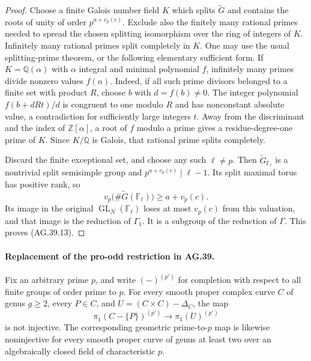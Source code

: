 \begin{proof}
Choose a finite Galois number field \(K\) which splits
\(\widetilde G\) and contains the roots of unity of order
\(p^{a+v_p(c)}\). Exclude also the finitely many rational
primes needed to spread the chosen splitting isomorphism
over the ring of integers of \(K\). Infinitely many rational primes split
completely in \(K\). One may use the usual splitting-prime
theorem, or the following elementary sufficient form. If
\(K=\mathbb Q(\alpha)\) with \(\alpha\) integral and minimal
polynomial \(f\), infinitely many primes divide nonzero values
\(f(n)\). Indeed, if all such prime divisors belonged to a
finite set with product \(R\), choose \(b\) with
\(d=f(b)\ne0\). The integer polynomial
\(f(b+dRt)/d\) is congruent to one modulo \(R\) and has
nonconstant absolute value, a contradiction for sufficiently
large integers \(t\). Away from the discriminant and the
index of \(\mathbb Z[\alpha]\), a root of \(f\) modulo a
prime gives a residue-degree-one prime of \(K\). Since
\(K/\mathbb Q\) is Galois, that rational prime splits completely.

Discard the finite exceptional set, and choose any such
\(\ell\ne p\). Then \(\widetilde G_{\mathbb F_\ell}\)
is a nontrivial split semisimple group and
\(p^{a+v_p(c)}\mid\ell-1\). Its split maximal torus has
positive rank, so
\[
       v_p\bigl(\#\widetilde G(\mathbb F_\ell)\bigr)
                          \geq a+v_p(c).
\]
Its image in the original \(\operatorname{GL}_N(\mathbb F_\ell)\)
loses at most \(v_p(c)\) from this valuation, and that image is
the reduction of \(\Gamma_1\). It is a subgroup of the
reduction of \(\Gamma\). This proves (AG.39.13).
\end{proof}

\paragraph{Replacement of the pro-odd restriction in AG.39.}
Fix an arbitrary prime \(p\), and write \((-)^{(p')}\) for
completion with respect to all finite groups of order prime
to \(p\). For every smooth proper complex curve \(C\) of
genus \(g\geq2\), every \(P\in C\), and
\(U=(C\times C)-\Delta_C\), the map
\[
       \pi_1(C-\{P\})^{(p')}
                 \longrightarrow \pi_1(U)^{(p')}
                                                        \tag{AG.39.14}
\]
is not injective. The corresponding geometric prime-to-\(p\)
map is likewise noninjective for every smooth proper curve of
genus at least two over an algebraically closed field of
characteristic \(p\).

